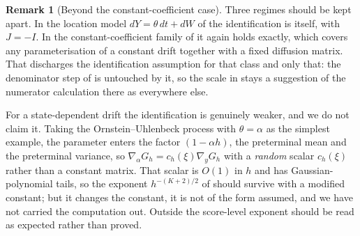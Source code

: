 \documentclass[11pt]{article}
\theoremstyle{definition}
\newtheorem{remark}[remark]{Remark}
\begin{document}
\begin{remark}[Beyond the constant-coefficient case]\label{rem:score_identification}
Three regimes should be kept apart. In the location model $dY=\theta\,dt+dW$ of  the identification is  itself, with $J=-I$. In the constant-coefficient family of  it again holds exactly, which covers any parameterisation of a constant drift together with a fixed diffusion matrix. That discharges the identification assumption for that class and only that: the denominator step of  is untouched by it, so the scale in  stays a suggestion of the numerator calculation there as everywhere else.

For a state-dependent drift the identification is genuinely weaker, and we do not claim it. Taking the Ornstein--Uhlenbeck process with $\theta=\alpha$ as the simplest example, the parameter enters the factor $(1-\alpha h)$, the preterminal mean and the preterminal variance, so $\nabla_\alpha G_h=c_h(\xi)\nabla_yG_h$ with a \emph{random} scalar $c_h(\xi)$ rather than a constant matrix. That scalar is $O(1)$ in $h$ and has Gaussian-polynomial tails, so the exponent $h^{-(K+2)/2}$ of  should survive with a modified constant; but it changes the constant, it is not of the form assumed, and we have not carried the computation out. Outside  the score-level exponent should be read as expected rather than proved.
\end{remark}
\end{document}
